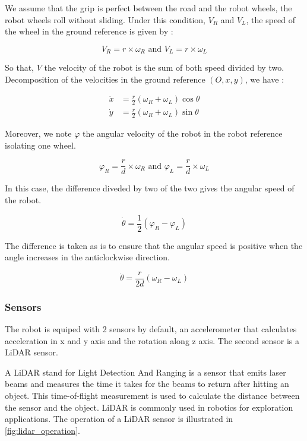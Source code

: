 \documentclass[../main.tex]{subfiles}
\begin{document}
We assume that the grip is perfect between the road and the robot wheels, the robot wheels roll without sliding. Under this condition, $V_R$ and $V_L$, the speed of the wheel in the ground reference is given by :

$$\displaystyle V_R = r \times \omega_R \text{     and     } V_L = r \times \omega_L$$

So that, $V$ the velocity of the robot is the sum of both speed divided by two. Decomposition of the velocities in the ground reference $(O, x, y)$, we have :


\begin{align*}
	\displaystyle \dot{x} &= \frac{r}{2} \left(\omega_R + \omega_L\right) \cos \theta\\
	\displaystyle \dot{y} &= \frac{r}{2} \left(\omega_R + \omega_L\right) \sin \theta
\end{align*}


Moreover, we note $\varphi$ the angular velocity of the robot in the robot reference isolating one wheel.


$$\displaystyle \varphi_R = \frac{r}{d} \times \omega_R \text{     and     } \varphi_L =  \frac{r}{d} \times \omega_L$$

In this case, the difference diveded by two of the two gives the angular speed of the robot.

$$\displaystyle \dot{\theta} = \frac{1}{2} \left(\varphi_R - \varphi_L\right)$$

The difference is taken as is to ensure that the angular speed is positive when the angle increases in the anticlockwise direction.

$$\displaystyle \dot{\theta} = \frac{r}{2d} \left(\omega_R - \omega_L\right)$$


\subsubsection{Sensors}

The robot is equiped with 2 sensors by default, an accelerometer that calculates acceleration in x and y axis and the rotation along z axis. The second sensor is a LiDAR sensor.

\vspace{1em}

A LiDAR stand for Light Detection And Ranging is a sensor that emits laser beams and measures the time it takes for the beams to return after hitting an object. This time-of-flight measurement is used to calculate the distance between the sensor and the object. LiDAR is commonly used in robotics for exploration applications. The operation of a LiDAR sensor is illustrated in \autoref{fig:lidar_operation}.
\end{document}
